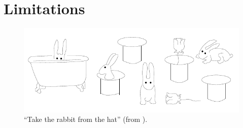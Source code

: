 \section{Limitations}
\label{sec:problem}

\begin{figure}
  \centering
  \includegraphics[width=\columnwidth]{pic-rabbits}
  \caption{``Take the rabbit from the hat'' (from \cite{Stone1998a}).}
  \label{fig:rabbits}
\end{figure}

\cite{Stone1998a}

